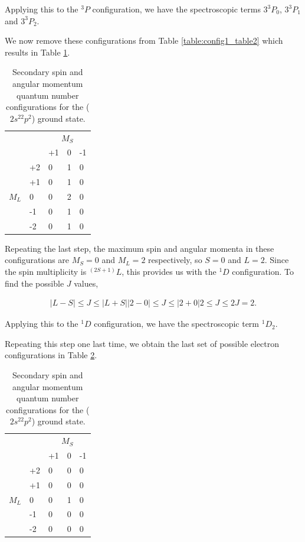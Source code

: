 \documentclass[12pt]{article}
\begin{document}
Applying this to the $^3P$ configuration, we have the spectroscopic terms $3^3P_0$, $3^3P_1$ and $3^3P_2$.

We now remove these configurations from Table \ref{table:config1_table2} which results in Table \ref{table:config1_table3}.

\begin{table}[ht]
\centering
\caption{Secondary spin and angular momentum quantum number configurations for the ($2s^22p^2$) ground state.}
\label{table:config1_table3}
\begin{tabular}{|ll|lll|}
\hline
\multicolumn{2}{|c}{} & \multicolumn{3}{|c|}{$M_S$} \\
\multicolumn{2}{|c|}{} & +1 & 0 & -1 \\
\hline
      & +2 & 0 & 1 & 0 \\
      & +1 & 0 & 1 & 0 \\
$M_L$ &  0 & 0 & 2 & 0 \\
      & -1 & 0 & 1 & 0 \\
      & -2 & 0 & 1 & 0 \\
\hline
\end{tabular}
\end{table}

Repeating the last step, the maximum spin and angular momenta in these configurations are $M_S = 0$ and $M_L = 2$ respectively, so $S=0$ and $L=2$. Since the spin multiplicity is $^{(2S+1)}L$, this provides us with the $^1D$ configuration. To find the possible $J$ values,

\begin{align*}
|L-S| \leq J \leq |L+S|
|2-0| \leq J \leq |2+0|
2 \leq J \leq 2
J = 2.
\end{align*}

Applying this to the $^1D$ configuration, we have the spectroscopic term $^1D_2$.

Repeating this step one last time, we obtain the last set of possible electron configurations in Table \ref{table:config1_table4}.

\begin{table}[ht]
\centering
\caption{Secondary spin and angular momentum quantum number configurations for the ($2s^22p^2$) ground state.}
\label{table:config1_table4}
\begin{tabular}{|ll|lll|}
\hline
\multicolumn{2}{|c}{} & \multicolumn{3}{|c|}{$M_S$} \\
\multicolumn{2}{|c|}{} & +1 & 0 & -1 \\
\hline
      & +2 & 0 & 0 & 0 \\
      & +1 & 0 & 0 & 0 \\
$M_L$ &  0 & 0 & 1 & 0 \\
      & -1 & 0 & 0 & 0 \\
      & -2 & 0 & 0 & 0 \\
\hline
\end{tabular}
\end{table}
\end{document}

